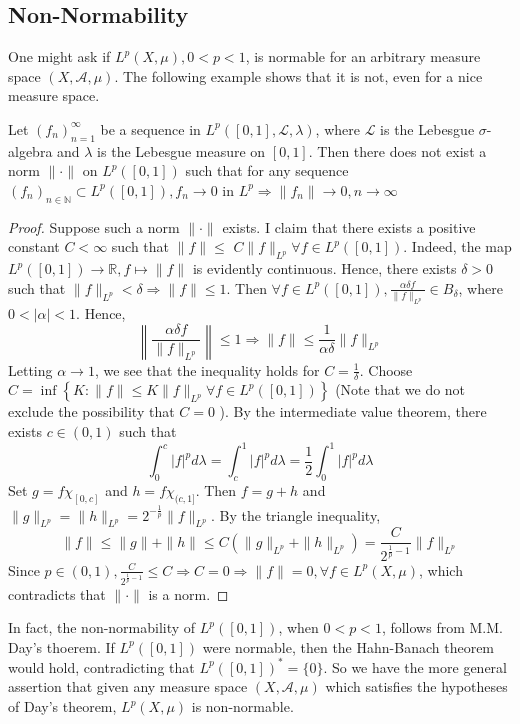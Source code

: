 \subsection{Non-Normability}
One might ask if $L^{p}(X, \mu), 0<p<1$, is normable for an arbitrary measure space $(X, \mathcal{A}, \mu)$. The following example shows that it is not, even for a nice measure space.

\begin{proposition}
    Let $\left(f_{n}\right)_{n=1}^{\infty}$ be a sequence in $L^{p}([0,1], \mathcal{L}, \lambda)$, where $\mathcal{L}$ is the Lebesgue $\sigma$-algebra and $\lambda$ is the Lebesgue measure on $[0,1] .$ Then there does not exist a norm $\|\cdot\|$ on $L^{p}([0,1])$ such that for any sequence $\left(f_{n}\right)_{n \in \mathbb{N}} \subset L^{p}([0,1]), f_{n} \rightarrow 0$ in $L^{p} \Rightarrow\left\|f_{n}\right\| \rightarrow 0, n \rightarrow \infty$
\end{proposition}

\begin{proof}
    Suppose such a norm $\|\cdot\|$ exists. I claim that there exists a positive constant $C<\infty$ such that $\|f\| \leq$ $C\|f\|_{L^{p}} \forall f \in L^{p}([0,1]) .$ Indeed, the map $L^{p}([0,1]) \rightarrow \mathbb{R}, f \mapsto\|f\|$ is evidently continuous. Hence, there exists $\delta>0$ such that $\|f\|_{L^{p}}<\delta \Rightarrow\|f\| \leq 1$. Then $\forall f \in L^{p}([0,1]), \frac{\alpha \delta f}{\|f\|_{L^{p}}} \in B_{\delta}$, where $0<|\alpha|<1 .$ Hence,
    \[
        \left\|\frac{\alpha \delta f}{\|f\|_{L^{p}}}\right\| \leq 1 \Rightarrow\|f\| \leq \frac{1}{\alpha \delta}\|f\|_{L^{p}}
    \]
    Letting $\alpha \rightarrow 1$, we see that the inequality holds for $C=\frac{1}{\delta} .$ Choose $C=\inf \left\{K:\|f\| \leq K\|f\|_{L^{p}} \forall f \in L^{p}([0,1])\right\}$ (Note that we do not exclude the possibility that $C=0$ ). By the intermediate value theorem, there exists $c \in(0,1)$ such that
    \[
        \int_{0}^{c}|f|^{p} d \lambda=\int_{c}^{1}|f|^{p} d \lambda=\frac{1}{2} \int_{0}^{1}|f|^{p} d \lambda
    \]
    Set $g=f \chi_{[0, c]}$ and $h=f \chi_{(c, 1]} .$ Then $f=g+h$ and $\|g\|_{L^{p}}=\|h\|_{L^{p}}=2^{-\frac{1}{p}}\|f\|_{L^{p}} .$ By the triangle inequality,
    \[
        \|f\| \leq\|g\|+\|h\| \leq C\left(\|g\|_{L^{p}}+\|h\|_{L^{p}}\right)=\frac{C}{2^{\frac{1}{p}-1}}\|f\|_{L^{p}}
    \]
    Since $p \in(0,1), \frac{C}{2^{\frac{1}{p}-1}} \leq C \Rightarrow C=0 \Rightarrow\|f\|=0 ,\forall f \in L^{p}(X, \mu)$, which contradicts that $\|\cdot\|$ is a norm.
\end{proof}

\begin{remark}
    In fact, the non-normability of $L^{p}([0,1])$, when $0<p<1$, follows from M.M. Day's thoerem. If $L^{p}([0,1])$ were normable, then the Hahn-Banach theorem would hold, contradicting that $L^{p}([0,1])^{*}=\{0\}$. So we have the more general assertion that given any measure space $(X, \mathcal{A}, \mu)$ which satisfies the hypotheses of Day's theorem, $L^{p}(X, \mu)$ is non-normable.
\end{remark}